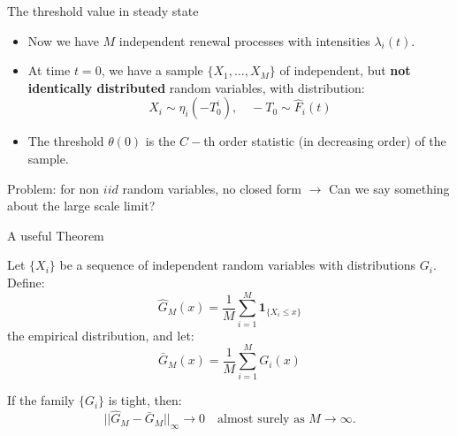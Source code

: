\documentclass[aspectratio=169]{beamer}
\newcommand{\ind}[1]{\mathbf{1}_{#1}}
\newenvironment*{myitem}[1][1.5em]{\begin{itemize}\setlength{\itemsep}{#1}}{\end{itemize}}
\begin{document}
\begin{frame}{The threshold value in steady state}
	
	\begin{myitem}[1em]
		\item Now we have $M$ independent renewal processes with intensities $\lambda_i(t)$.
		\item At time $t=0$, we have a sample $\{X_1,\ldots,X_M\}$ of independent, but \textbf{not identically distributed} random variables, with distribution:
		\begin{equation*}
			X_i \sim \eta_i(-T_0^i), \quad -T_0\sim \hat{F}_i(t) 
		\end{equation*}

		\item The threshold $\theta(0)$ is the $C-$th \alert{order statistic} (in decreasing order) of the sample.
	\end{myitem}
	\vfill
	\alert{Problem:} for non $iid$ random variables, no closed form $\to$ Can we say something about the large scale limit?
\end{frame}

\begin{frame}{A useful Theorem}
	
	Let $\{X_i\}$ be a sequence of independent random variables with distributions $G_i$. Define:
	\begin{equation*}
		\hat{G}_M(x) = \frac{1}{M}\sum_{i=1}^M \ind{\{X_i\leqslant x\}}
	\end{equation*}
	the empirical distribution, and let:
	\begin{equation*}
		\bar{G}_M(x) = \frac{1}{M}\sum_{i=1}^M G_i(x)
	\end{equation*}
	
	\begin{theorem}[Shorack]
		If the family $\{G_i\}$ is tight, then:
		\begin{equation*}
			||\hat{G}_M - \bar{G}_M||_\infty \to 0 \quad \text{almost surely as }M\to\infty.
		\end{equation*}
	\end{theorem}
\end{frame}
\end{document}
